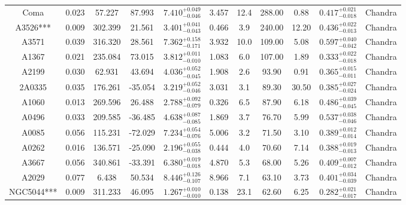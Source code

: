 \documentclass{aa}   %
\begin{document}
\begin{table}[ht!]
\begin{center}
\begin{tabular}{ c  c  c  c c c c c c c c }
Coma                		&		0.023	&	57.227	& 	87.993	& $	7.410^{+0.049}_{-0.046}$  &      3.457	&  12.4	&	288.00	&	0.88	&  	$ 0.417^{+0.021}_{-0.018}  $ &	  Chandra     \\
A3526***            		&		0.009	&	302.399	&	21.561	& $	3.401^{+0.041}_{-0.043}$  &      0.466	&  3.9	&	240.00	&	12.20	&	$ 0.436^{+0.022}_{-0.013}  $ &	 Chandra      \\
A3571               		&		0.039	&	316.320	&	28.561	& $	7.362^{+0.158}_{-0.171}$  &      3.932	&  10.0	&	109.00	&	5.08	&	$ 0.597^{+0.040}_{-0.042}  $ &	 Chandra      \\
A1367               		&		0.021	&	235.084	&	73.015	& $	3.812^{+0.011}_{-0.010}$  &      1.083	&  6.0	&	107.00	&	1.89	&	$ 0.333^{+0.022}_{-0.018}  $ &	  Chandra     \\
A2199               		&		0.030	&	62.931	&	43.694	& $	4.036^{+0.052}_{-0.045}$  &      1.908	&  2.6	&	93.90	&	0.91	&	$ 0.365^{+0.015}_{-0.011}  $ &	  Chandra     \\
2A0335              		&		0.035	&	176.261	&	-35.054	& $	3.219^{+0.052}_{-0.046}$  &      3.031	&  3.1	&	89.30	&	30.50	&	$ 0.385^{+0.027}_{-0.024}  $ &	 Chandra      \\
A1060               		&		0.013	&	269.596	&	26.488	& $	2.788^{+0.092}_{-0.079}$  &      0.326	&  6.5	&	87.90	&	6.18	&	$ 0.486^{+0.039}_{-0.045}  $ &	 Chandra      \\
A0496               		&		0.033	&	209.585	&	-36.485	& $	4.638^{+0.087}_{-0.085}$  &      1.869	&  3.7	&	76.70	&	5.99	&	$ 0.537^{+0.038}_{-0.046}  $ &	 Chandra      \\
A0085               		&		0.056	&	115.231	&	-72.029	& $	7.234^{+0.054}_{-0.076}$  &      5.006	&  3.2	&	71.50	&	3.10	&	$ 0.389^{+0.012}_{-0.014}  $ &	  Chandra     \\
A0262               		&		0.016	&	136.571	&	-25.090	& $	2.196^{+0.055}_{-0.038}$  &      0.444	&  4.0	&	70.60	&	7.14	&	$ 0.388^{+0.019}_{-0.013}  $ &	 Chandra      \\
A3667               		&		0.056	&	340.861	&	-33.391	& $	6.380^{+0.019}_{-0.018}$  &      4.870	&  5.3	&	68.00	&	5.26	&	$ 0.409^{+0.007}_{-0.012}  $ &	  Chandra     \\
A2029               		&		0.077	&	6.438	&	50.534	& $	8.446^{+0.126}_{-0.107}$  &      8.966	&  7.1	&	63.10	&	3.73	&	$ 0.401^{+0.034}_{-0.039}  $ &	  Chandra     \\
NGC5044***          		&		0.009	&	311.233	&	46.095	& $	1.267^{+0.010}_{-0.010}$  &      0.138	&  23.1	&	62.60	&	6.25	&	$ 0.282^{+0.021}_{-0.017}  $ &	 Chandra      \\

\end{tabular}
\end{center}
\end{table}
\end{document}
